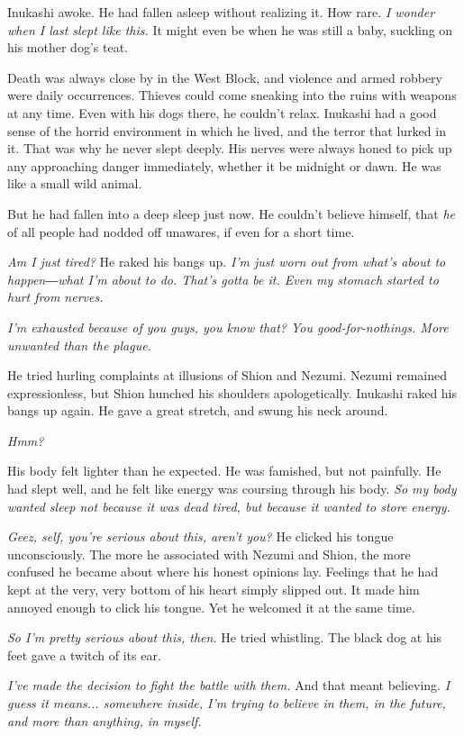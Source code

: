 Inukashi awoke. He had fallen asleep without realizing it. How rare. \emph{I
wonder when I last slept like this.} It might even be when he was still a
baby, suckling on his mother dog's teat.

Death was always close by in the West Block, and violence and armed
robbery were daily occurrences. Thieves could come sneaking into the
ruins with weapons at any time. Even with his dogs there, he couldn't
relax. Inukashi had a good sense of the horrid environment in which he
lived, and the terror that lurked in it. That was why he never slept
deeply. His nerves were always honed to pick up any approaching danger
immediately, whether it be midnight or dawn. He was like a small wild
animal.

But he had fallen into a deep sleep just now. He couldn't believe
himself, that \emph{he} of all people had nodded off unawares, if even for a
short time.

\emph{Am I just tired?} He raked his bangs up. \emph{I'm just worn out from what's
about to happen―what I'm about to do. That's gotta be it. Even my
stomach started to hurt from nerves.}

\emph{I'm exhausted because of you guys, you know that? You good-for-nothings.
More unwanted than the plague.}

He tried hurling complaints at illusions of Shion and Nezumi. Nezumi
remained expressionless, but Shion hunched his shoulders apologetically.
Inukashi raked his bangs up again. He gave a great stretch, and swung
his neck around.

\emph{Hmm?}

His body felt lighter than he expected. He was famished, but not
painfully. He had slept well, and he felt like energy was coursing
through his body. \emph{So my body wanted sleep not because it was dead tired,
but because it wanted to store energy.}

\emph{Geez, self, you're serious about this, aren't you?} He clicked his tongue
unconsciously. The more he associated with Nezumi and Shion, the more
confused he became about where his honest opinions lay. Feelings that he
had kept at the very, very bottom of his heart simply slipped out. It
made him annoyed enough to click his tongue. Yet he welcomed it at the
same time.

\emph{So I'm pretty serious about this, then.} He tried whistling. The black
dog at his feet gave a twitch of its ear.

\emph{I've made the decision to fight the battle with them.} And that meant
believing. \emph{I guess it means... somewhere inside, I'm trying to believe
in them, in the future, and more than anything, in myself.}


